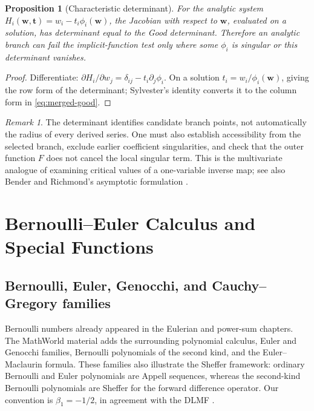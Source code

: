 \documentclass[11pt,a4paper,oneside,openany]{book}
\newtheorem{proposition}[theorem]{Proposition}
\theoremstyle{definition}
\theoremstyle{remark}
\newtheorem{remark}[theorem]{Remark}
\begin{document}
\begin{proposition}[Characteristic determinant]
\label{prop:merged-characteristic}
For the analytic system $H_i(\bm w,\bm t)=w_i-t_i\phi_i(\bm w)$, the Jacobian
with respect to $\bm w$, evaluated on a solution, has determinant equal to the
Good determinant.  Therefore an analytic branch can fail the implicit-function
test only where some $\phi_i$ is singular or this determinant vanishes.
\end{proposition}

\begin{proof}
Differentiate:
$\partial H_i/\partial w_j=\delta_{ij}-t_i\partial_j\phi_i$.
On a solution $t_i=w_i/\phi_i(\bm w)$, giving the row form of the determinant;
Sylvester's identity converts it to the column form in
\eqref{eq:merged-good}.
\end{proof}

\begin{remark}
The determinant identifies candidate branch points, not automatically the
radius of every derived series.  One must also establish accessibility from
the selected branch, exclude earlier coefficient singularities, and check
that the outer function $F$ does not cancel the local singular term.  This is
the multivariate analogue of examining critical values of a one-variable
inverse map; see also Bender and Richmond's asymptotic formulation
\cite{BenderRichmond1998}.
\end{remark}

\part{Bernoulli--Euler Calculus and Special Functions}

\chapter{Bernoulli, Euler, Genocchi, and Cauchy--Gregory families}
\label{ch:merged-bernoulli-euler}

Bernoulli numbers already appeared in the Eulerian and power-sum chapters.
The MathWorld material adds the surrounding polynomial calculus, Euler and
Genocchi families, Bernoulli polynomials of the second kind, and the
Euler--Maclaurin formula.  These families also illustrate the Sheffer
framework: ordinary Bernoulli and Euler polynomials are Appell sequences,
whereas the second-kind Bernoulli polynomials are Sheffer for the forward
difference operator.  Our convention is $\beta_1=-1/2$, in agreement with the
DLMF \cite{NISTDLMF}.
\end{document}

